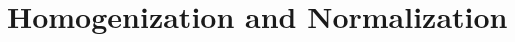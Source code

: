 \documentclass{subfile}
\begin{document}
	\section{Homogenization and Normalization}\label{sec:homonorm}
\end{document}
